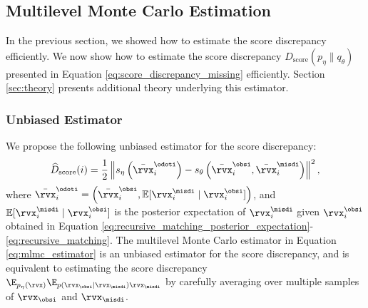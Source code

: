 \subsection{Multilevel Monte Carlo Estimation}
\label{sec:mlmc_estimator}
In the previous section, we showed how to estimate the score discrepancy efficiently. We now show how to estimate the score discrepancy $D_{\text{score}}(p_{\eta} \| q_{\theta})$ presented in Equation \eqref{eq:score_discrepancy_missing} efficiently. Section \ref{sec:theory} presents additional theory underlying this estimator.

\subsubsection{Unbiased Estimator}

We propose the following unbiased estimator for the score discrepancy:
\begin{align}
	\widehat{D}_{\text{score}}(i) = \frac{1}{2} \left\| s_{\eta} \left( \bar{\rvx}_{i}^{\odoti} \right) - s_{\theta} \left( \bar{\rvx}_{i}^{\obsi}, \bar{\rvx}_{i}^{\misdi} \right) \right\|^{2}, \label{eq:mlmc_estimator}
\end{align}
where $\bar{\rvx}_{i}^{\odoti} = \left( \bar{\rvx}_{i}^{\obsi}, \mathbb{E}[\rvx_{i}^{\misdi} \mid \rvx_{i}^{\obsi}] \right)$, and $\mathbb{E}[\rvx_{i}^{\misdi} \mid \rvx_{i}^{\obsi}]$ is the posterior expectation of $\rvx_{i}^{\misdi}$ given $\rvx_{i}^{\obsi}$ obtained in Equation \eqref{eq:recursive_matching_posterior_expectation}-\eqref{eq:recursive_matching}. The multilevel Monte Carlo estimator in Equation \eqref{eq:mlmc_estimator} is an unbiased estimator for the score discrepancy, and is equivalent to estimating the score discrepancy $\E_{p_{\eta}(\rvx)} \E_{p(\rvx_{\obsi} | \rvx_{\misdi}) \rvx_{\misdi}}$ by carefully averaging over multiple samples of $\rvx_{\obsi}$ and $\rvx_{\misdi}$.

